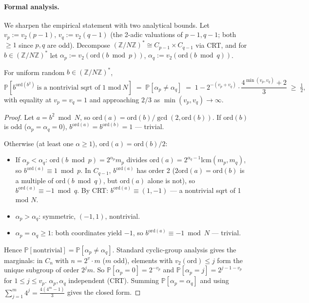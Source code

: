 \documentclass[11pt]{article}
\begin{document}
\paragraph{Formal analysis.} We sharpen the empirical statement with two analytical bounds. Let $v_p := v_2(p - 1)$, $v_q := v_2(q - 1)$ (the 2-adic valuations of $p-1, q-1$; both $\geq 1$ since $p, q$ are odd). Decompose $(\mathbb{Z}/N\mathbb{Z})^* \cong C_{p-1} \times C_{q-1}$ via CRT, and for $b \in (\mathbb{Z}/N\mathbb{Z})^*$ let $\alpha_p := v_2(\mathrm{ord}(b \bmod p))$, $\alpha_q := v_2(\mathrm{ord}(b \bmod q))$.

\begin{lemma}\label{lem:b-sqrt}
For uniform random $b \in (\mathbb{Z}/N\mathbb{Z})^*$,
\[
  \mathbb{P}[b^{\mathrm{ord}(b^2)}\ \text{is a nontrivial sqrt of 1 mod}\ N]
    \;=\; \mathbb{P}[\alpha_p \neq \alpha_q]
    \;=\; 1 - 2^{-(v_p + v_q)} \cdot \frac{4^{\min(v_p, v_q)} + 2}{3}
    \;\geq\; \tfrac{1}{2},
\]
with equality at $v_p = v_q = 1$ and approaching $2/3$ as $\min(v_p, v_q) \to \infty$.
\end{lemma}

\begin{proof}
Let $a = b^2 \bmod N$, so $\mathrm{ord}(a) = \mathrm{ord}(b) / \gcd(2, \mathrm{ord}(b))$. If $\mathrm{ord}(b)$ is odd ($\alpha_p = \alpha_q = 0$), $b^{\mathrm{ord}(a)} = b^{\mathrm{ord}(b)} = 1$ --- trivial.

Otherwise (at least one $\alpha \geq 1$), $\mathrm{ord}(a) = \mathrm{ord}(b)/2$:
\begin{itemize}
  \item If $\alpha_p < \alpha_q$: $\mathrm{ord}(b \bmod p) = 2^{\alpha_p} m_p$ divides $\mathrm{ord}(a) = 2^{\alpha_q - 1} \mathrm{lcm}(m_p, m_q)$, so $b^{\mathrm{ord}(a)} \equiv 1 \bmod p$. In $C_{q-1}$, $b^{\mathrm{ord}(a)}$ has order 2 ($2 \mathrm{ord}(a) = \mathrm{ord}(b)$ is a multiple of $\mathrm{ord}(b \bmod q)$, but $\mathrm{ord}(a)$ alone is not), so $b^{\mathrm{ord}(a)} \equiv -1 \bmod q$. By CRT: $b^{\mathrm{ord}(a)} \equiv (1, -1)$ --- a nontrivial sqrt of 1 mod $N$.
  \item $\alpha_p > \alpha_q$: symmetric, $(-1, 1)$, nontrivial.
  \item $\alpha_p = \alpha_q \geq 1$: both coordinates yield $-1$, so $b^{\mathrm{ord}(a)} \equiv -1 \bmod N$ --- trivial.
\end{itemize}

Hence $\mathbb{P}[\text{nontrivial}] = \mathbb{P}[\alpha_p \neq \alpha_q]$. Standard cyclic-group analysis gives the marginals: in $C_n$ with $n = 2^v \cdot m$ ($m$ odd), elements with $v_2(\mathrm{ord}) \leq j$ form the unique subgroup of order $2^j m$. So $\mathbb{P}[\alpha_p = 0] = 2^{-v_p}$ and $\mathbb{P}[\alpha_p = j] = 2^{j - 1 - v_p}$ for $1 \leq j \leq v_p$. $\alpha_p, \alpha_q$ independent (CRT). Summing $\mathbb{P}[\alpha_p = \alpha_q]$ and using $\sum_{j=1}^{m} 4^j = \tfrac{4(4^m - 1)}{3}$ gives the closed form.
\end{proof}
\end{document}
